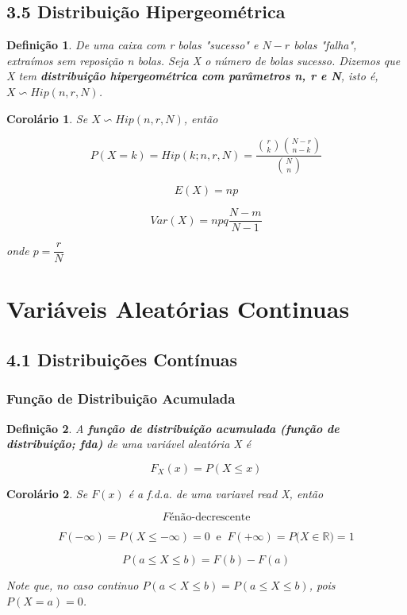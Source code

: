 \documentclass[12pt]{article}
\newtheorem{corollary}{Corolário}[theorem]
\newtheorem{definition}{Definição}
\begin{document}
\subsection*{3.5 Distribuição Hipergeométrica}
\begin{definition}
    De uma caixa com r bolas "sucesso" e $N-r$ bolas "falha", extraímos sem reposição n bolas. Seja X o número de bolas sucesso. Dizemos que X tem \textbf{distribuição hipergeométrica com parâmetros n, r e N}, isto é, $X \backsim Hip (n, r, N)$.
\end{definition}
    
\begin{corollary}
    Se $X \backsim Hip (n, r, N)$, então
    
    $$P(X = k) = Hip (k; n, r, N) = \dfrac{{r \choose k}{N-r \choose n-k}}{{N \choose n}}$$
    
    $$E(X) = n p$$
    
    $$Var(X) = n p q \frac{N - m}{N -1}$$
    
    onde $p = \dfrac{r}{N}$
\end{corollary}

\section{Variáveis Aleatórias Continuas}
\subsection*{4.1 Distribuições Contínuas}
\subsubsection*{Função de Distribuição Acumulada}

\begin{definition}
    A \textbf{função de distribuição acumulada (função de distribuição; fda)} de uma variável aleatória X é
    
    $$F_X(x) = P(X \leq x)$$
\end{definition}

\begin{corollary}
    Se $F(x)$ é a f.d.a. de uma variavel read X, então
    
    $$F é \text{não-decrescente}$$
    
    $$F(- \infty) = P(X \leq - \infty) = 0 \ \text{ e } \ F(+\infty) = P(X \in \mathbb{R)} = 1$$
    
    $$P(a \leq X \leq b) = F(b) - F(a)$$
    
    Note que, no caso continuo $P(a < X \leq b) = P(a \leq X \leq b)$, pois $P(X = a) = 0$.
\end{corollary}
\end{document}
